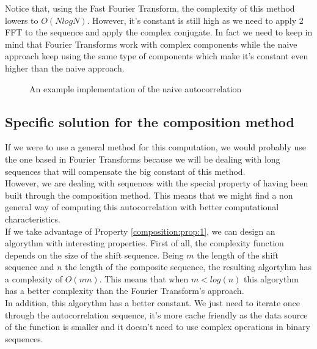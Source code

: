         Notice that, using the Fast Fourier
        Transform\cite{fast_fourier_transform}, the complexity of this
        method lowers to $O(N log N)$. However, it's constant is
        still high as we need to apply 2 FFT to the sequence and apply the
        complex conjugate. In fact we need to keep in mind that Fourier
        Transforms work with complex components while the naive approach keep
        using the same type of components which make it's constant even higher
        than the naive approach.

          \begin{figure}
            \caption{An example implementation of the naive autocorrelation}
            \label{naive_auto:fig:1}
          \end{figure}

      \subsection{Specific solution for the composition method}

      If we were to use a general method for this computation, we would probably
      use the one based in Fourier Transforms because we will be dealing with
      long sequences that will compensate the big constant of this method.\\

      However, we are dealing with sequences with the special property of
      having been built through the composition method. This means that we
      might find a non general way of computing this autocorrelation with better
      computational characteristics.\\

      If we take advantage of Property \ref{composition:prop:1}, we can design
      an algorythm with interesting properties. First of all, the complexity
      function depends on the size of the shift sequence. Being $m$ the
      length of the shift sequence and $n$ the length of the composite
      sequence, the resulting algortyhm has a complexity of $O(nm)$. This means
      that when $m < log(n)$ this algorythm has a better complexity than the
      Fourier Transform's approach.\\

      In addition, this algorythm has a better constant. We just need to
      iterate once through the autocorrelation sequence, it's more cache
      friendly as the data source of the function is smaller and it doesn't
      need to use complex operations in binary sequences.\\

